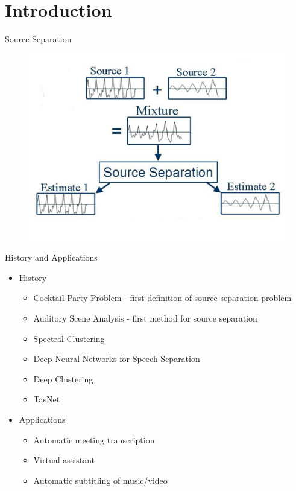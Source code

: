 \documentclass[xcolor=table,mathserif,9pt]{beamer}    %
\begin{document}
\section{Introduction}%
\label{sec:introduction}
\begin{frame}{Source Separation}

\begin{center}
	\begin{figure}
	\includegraphics[width=.6\textwidth]{images/separation_example.jpg}
	\end{figure}
\end{center}

\end{frame}

\begin{frame}{History and Applications}

\begin{itemize}
	\setlength\itemsep{1em}
	\item History
	\begin{itemize}
		\item Cocktail Party Problem - first definition of source separation problem \cite{Cherry:1953} 
		\item Auditory Scene Analysis - first method for source separation \cite{bregman} 
		\item Spectral Clustering \cite{Bach:2006} 
		\item Deep Neural Networks for Speech Separation \cite{SpeechSepDeepLearning:2015} 
		\item Deep Clustering \cite{DeepClustering2016}
		\item TasNet \cite{TasNet2017}
	\end{itemize}
	
	\item Applications
	\begin{itemize}
		\item Automatic meeting transcription 
		\item Virtual assistant
		\item Automatic subtitling of music/video
	\end{itemize}
\end{itemize}

\end{frame}
\end{document}
